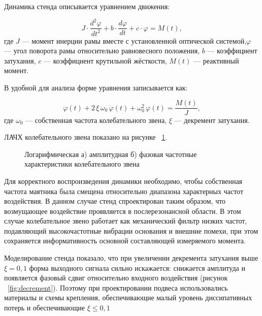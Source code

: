 Динамика стенда описывается уравнением движения:

\begin{equation}
	\label{eq:stadeq}
	J\cdot \frac{d^2\varphi}{dt^2}+b \cdot \frac{d\varphi}{dt}+ c \cdot \varphi = M(t),
\end{equation}
где \(J\) --- момент инерции рамы вместе с установленной оптической системой,\newline \(\varphi\) --- угол поворота рамы относительно равновесного положения, \(b\) --- коэффициент затухания, \(c\) --- коэффициент крутильной жёсткости, \(M(t)\) --- реактивный момент.

В удобной для анализа форме уравнения записывается как:

\begin{equation}
	\label{eq:standeq2}
	\ddot{\varphi}(t) + 2\,\xi\,\omega_0\,\dot{\varphi}(t) + \omega_0^{2}\,\varphi(t)
	= \frac{M(t)}{J},
\end{equation}
где \(\omega_0\) --- собственная частота колебательного звена, \(\xi\) --- декремент затухания.

ЛАЧХ колебательного звена показано на рисунке ~\cref{fig:afc}.

\begin{figure}[!h] 
	\caption{Логарифмическая а) амплитудная  б) фазовая частотные характеристики колебательного звена}
	\label{fig:afc} 
\end{figure}

Для корректного воспроизведения динамики необходимо, чтобы собственная частота маятника была смещена относительно диапазона характерных частот воздействия. В данном случае стенд спроектирован таким образом, что возмущающее воздействие проявляется в послерезонансной области. В этом случае колебательное звено работает как механический фильтр низких частот, подавляющий высокочастотные вибрации основания и внешние помехи, при этом сохраняется информативность основной составляющей измеряемого момента.

Моделирование стенда показало, что при увеличении декремента затухания выше $\xi=0,1$ форма выходного сигнала сильно искажается: снижается амплитуда и появляется фазовый сдвиг относительно входного воздействия (рисунок ~\cref{fig:decrement}). Поэтому при проектировании подвеса использовались материалы и схемы крепления, обеспечивающие малый уровень диссипативных потерь и обеспечивающие $\xi \leq 0,1$

